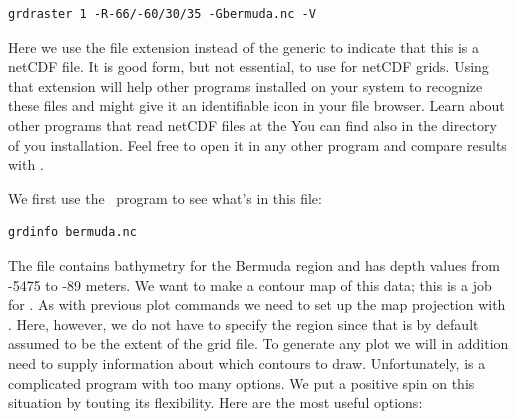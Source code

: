 \documentclass{report}
\begin{document}
{\small\begin{verbatim}
grdraster 1 -R-66/-60/30/35 -Gbermuda.nc -V
\end{verbatim}
}

Here we use the file extension  instead of the generic 
to indicate that this is a netCDF file. It is good form, but not essential,
to use  for netCDF grids. Using that extension will help
other programs installed on your system to recognize these files and might
give it an identifiable icon in your file browser.
Learn about other programs that read netCDF files at the
You can find  also in the  directory of you \GMT{}
installation.  Feel free to open it in any other program and compare results with \GMT.

We first use the \GMT\ program  to see what's in this file:

{\small\begin{verbatim} 
grdinfo bermuda.nc
\end{verbatim}
}

The file contains bathymetry for the Bermuda region and has depth
values from -5475 to -89 meters.  We want to make a contour map of
this data; this is a job for .  As with previous
plot commands we need to set up the map projection with .
Here, however, we do not have to specify the region since that is by
default assumed to be the extent of the grid file.
To generate any plot we will in addition need to supply information
about which contours to draw.  Unfortunately, 
is a complicated program with too many options.  We put a positive
spin on this situation by touting its flexibility.  Here are the most
useful options:
\end{document}
